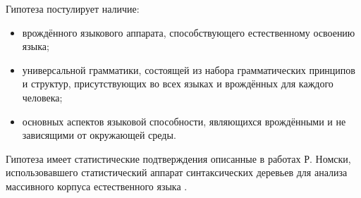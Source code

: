 Гипотеза постулирует наличие:
\begin{itemize}
    \item врождённого языкового аппарата, способствующего естественному освоению языка;
    \item универсальной грамматики, состоящей из набора грамматических принципов и структур, присутствующих во всех языках и врождённых для каждого человека;
    \item основных аспектов языковой способности, являющихся врождёнными и не зависящими от окружающей среды.
\end{itemize}

Гипотеза имеет статистические подтверждения описанные в работах Р. Номски, использовавшего статистический аппарат синтаксических деревьев для анализа массивного
корпуса естественного языка \cite{everaert2015structures}\cite{montague1970universal}.





